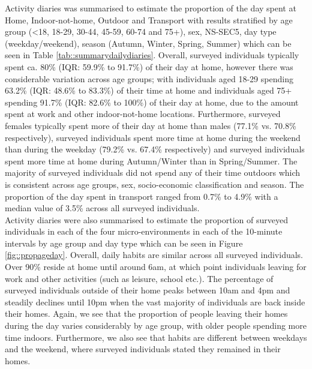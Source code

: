 \documentclass{article}
\begin{document}
\noindent Activity diaries was summarised to estimate the proportion of the day spent at Home, Indoor-not-home, Outdoor and Transport with results stratified by age group (<18, 18-29, 30-44, 45-59, 60-74 and 75+), sex, NS-SEC5, day type (weekday/weekend), season (Autumn, Winter, Spring, Summer) which can be seen in Table \ref{tab::summarydailydiaries}. Overall, surveyed individuals typically spent ca. 80\% (IQR: 59.9\% to 91.7\%) of their day at home, however there was considerable variation across age groups; with individuals aged 18-29 spending 63.2\% (IQR: 48.6\% to 83.3\%) of their time at home and individuals aged 75+ spending 91.7\% (IQR: 82.6\% to 100\%) of their day at home, due to the amount spent at work and other indoor-not-home locations. Furthermore, surveyed females typically spent more of their day at home than males (77.1\% vs. 70.8\% respectively), surveyed individuals spent more time at home during the weekend than during the weekday (79.2\% vs. 67.4\% respectively) and surveyed individuals spent more time at home during Autumn/Winter than in Spring/Summer. The majority of surveyed individuals did not spend any of their time outdoors which is consistent across age groups, sex, socio-economic classification and season. The proportion of the day spent in transport ranged from 0.7\% to 4.9\% with a median value of 3.5\% across all surveyed individuals. \\

\noindent Activity diaries were also summarised to estimate the proportion of surveyed individuals in each of the four micro-environments in each of the 10-minute intervals by age group and day type  which can be seen in Figure \ref{fig::propageday}. Overall, daily habits are similar across all surveyed individuals. Over 90\% reside at home until around 6am, at which point individuals leaving for work and other activities (such as leisure, school etc.). The percentage of surveyed individuals outside of their home peaks between 10am and 4pm and steadily declines until 10pm when the vast majority of individuals are back inside their homes. Again, we see that the proportion of people leaving their homes during the day varies considerably by age group, with older people spending more time indoors. Furthermore, we also see that habits are different between weekdays and the weekend, where surveyed individuals stated they remained in their homes. \\
\end{document}
